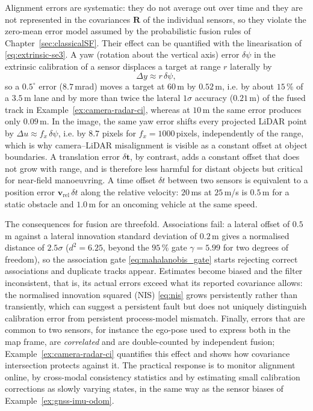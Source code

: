 Alignment errors are systematic: they do not average out over time and they are not represented in the covariances $\mathbf{R}$ of the individual sensors, so they violate the zero-mean error model assumed by the probabilistic fusion rules of Chapter~\ref{sec:classicalSF}. Their effect can be quantified with the linearisation of \eqref{eq:extrinsic-se3}. A yaw (rotation about the vertical axis) error $\delta\psi$ in the extrinsic calibration of a sensor displaces a target at range $r$ laterally by
\begin{equation}
\Delta y \approx r\,\delta\psi,
\label{eq:yaw-error-lateral}
\end{equation}
so a $0.5^{\circ}$ error ($8.7$\,mrad) moves a target at $60$\,m by $0.52$\,m, i.e. by about $15$\,\% of a $3.5$\,m lane and by more than twice the lateral $1\sigma$ accuracy ($0.21$\,m) of the fused track in Example~\ref{ex:camera-radar-ci}, whereas at $10$\,m the same error produces only $0.09$\,m. In the image, the same yaw error shifts every projected LiDAR point by $\Delta u\approx f_{x}\,\delta\psi$, i.e. by $8.7$ pixels for $f_{x}=1000$\,pixels, independently of the range, which is why camera--LiDAR misalignment is visible as a constant offset at object boundaries. A translation error $\delta\mathbf{t}$, by contrast, adds a constant offset that does not grow with range, and is therefore less harmful for distant objects but critical for near-field manoeuvring. A time offset $\delta t$ between two sensors is equivalent to a position error $\mathbf{v}_{\mathrm{rel}}\,\delta t$ along the relative velocity: $20$\,ms at $25$\,m/s is $0.5$\,m for a static obstacle and $1.0$\,m for an oncoming vehicle at the same speed.

The consequences for fusion are threefold. Associations fail: a lateral offset of $0.5$\,m against a lateral innovation standard deviation of $0.2$\,m gives a normalised distance of $2.5\sigma$ ($d^{2}=6.25$, beyond the $95$\,\% gate $\gamma=5.99$ for two degrees of freedom), so the association gate \eqref{eq:mahalanobis_gate} starts rejecting correct associations and duplicate tracks appear. Estimates become biased and the filter inconsistent, that is, its actual errors exceed what its reported covariance allows: the normalised innovation squared (NIS) \eqref{eq:nis} grows persistently rather than transiently, which can suggest a persistent fault but does not uniquely distinguish calibration error from persistent process-model mismatch. Finally, errors that are common to two sensors, for instance the ego-pose used to express both in the map frame, are \emph{correlated} and are double-counted by independent fusion; Example~\ref{ex:camera-radar-ci} quantifies this effect and shows how covariance intersection protects against it. The practical response is to monitor alignment online, by cross-modal consistency statistics and by estimating small calibration corrections as slowly varying states, in the same way as the sensor biases of Example~\ref{ex:gnss-imu-odom}.

